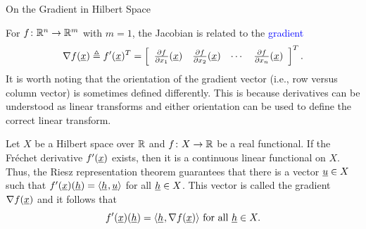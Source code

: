 \documentclass[10pt,english,aspectratio=169]{beamer}
\begin{document}
\begin{frame}{On the Gradient in Hilbert Space}

For $f\colon \mathbb{R}^n \to \mathbb{R}^m$ with $m=1$, the Jacobian is related to the \textcolor{blue}{gradient}
\[ \nabla f(\underline{x}) \triangleq f'(\underline{x})^T  = \left[ \begin{array}{cccc} \frac{\partial  f}{\partial  x_1} (\underline{x}) & \frac{\partial  f}{\partial  x_2} (\underline{x}) & \cdots & \frac{\partial  f}{\partial  x_n} (\underline{x}) \end{array} \right]^T. \]
It is worth noting that the orientation of the gradient vector (i.e., row versus column vector) is sometimes defined differently.
This is because derivatives can be understood as linear transforms and either orientation can be used to define the correct linear transform. 

\begin{example}
Let $X$ be a Hilbert space over $\mathbb{R}$ and $f\colon X \to \mathbb{R}$ be a real functional.
If the Fr\'{e}chet derivative $f'(\underline{x})$ exists, then it is a continuous linear functional on $X$.
Thus, the Riesz representation theorem guarantees that there is a vector $\underline{u} \in X$ such that
$ f'(\underline{x})(\underline{h}) = {\langle \underline{h}  \mskip1mu ,  \underline{u}  \rangle} $ for all $\underline{h}\in X$.
This vector is called the gradient $\nabla f(\underline{x})$ and it follows that \vspace{-1mm}
$$ f'(\underline{x})(\underline{h}) = {\langle \underline{h}  \mskip1mu ,  \nabla f (\underline{x})  \rangle} \text{ for all } \underline{h}\in X. $$
\end{example}

\end{frame}
\end{document}
